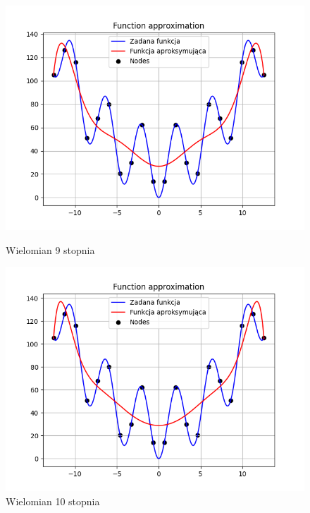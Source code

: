 \documentclass{article}
\begin{document}
\begin{figure}[H]
  \begin{minipage}[b]{0.49\textwidth}
    \begin{minipage}[b]{\textwidth}
      \includegraphics[width=\textwidth]{img16.png}
      \caption{Wielomian 9 stopnia}
    \end{minipage}
    \vspace*{\fill}
    \begin{minipage}[b]{\textwidth}
      \includegraphics[width=\textwidth]{img17.png}
      \caption{Wielomian 10 stopnia}
    \end{minipage}
  \end{minipage}
  \hfill
  \begin{minipage}[b]{0.49\textwidth}

\end{minipage}
\end{figure}
\end{document}
